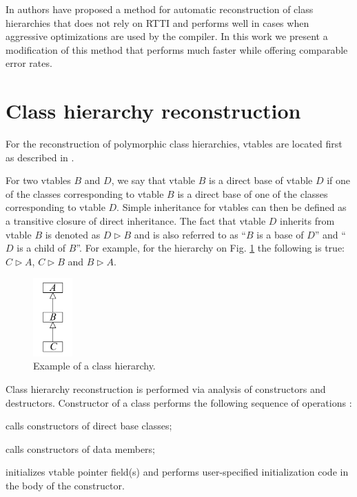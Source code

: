 \documentclass[times, 10pt,twocolumn]{article}
\renewcommand{\~}{{\raise.35ex\hbox{$\scriptstyle\sim$}}}
\newcounter{xcounter}
\renewenvironment{enumerate}{
    \begin{list}{\arabic{xcounter})}{\usecounter{xcounter} \itemsep=-\parsep}
}{
	\end{list}
}
\begin{document}
In \cite{fokin10} authors have proposed a
method for automatic reconstruction of class hierarchies
that does not rely on RTTI and performs well in cases
when aggressive optimizations are used by the compiler.
In this work we present a modification of this method
that performs much faster while offering comparable
error rates.




\quad
\section{Class hierarchy reconstruction}\label{sectionClasses}
For the reconstruction of polymorphic class hierarchies, vtables
are located first as described in \cite{fokin10}.

For two vtables $B$ and $D$, we say that vtable $B$ is a direct base of vtable $D$ if
one of the classes corresponding to vtable $B$ is a direct base of one of
the classes corresponding to vtable $D$.
Simple inheritance for vtables can then be defined as a transitive
closure of direct inheritance. The fact that vtable $D$ inherits
from vtable $B$ is denoted as $D \rhd B$ and is also referred to as
``$B$ is a base of $D$'' and ``$D$ is a child of $B$''. For example, for the
hierarchy on Fig. \ref{fig:abc} the following is true: 
$C \rhd A$, $C \rhd B$ and $B \rhd A$.

\begin{figure}[tb!]
\centering
  \includegraphics[height=3.0cm]{images/abc}
\caption{Example of a class hierarchy.}
\label{fig:abc}
\end{figure}

Class hierarchy reconstruction is performed via analysis of constructors
and destructors. Constructor of a class performs the following sequence
of operations \cite{cpp03, gray94}:
\begin{enumerate}
\item calls constructors of direct base classes;
\item calls constructors of data members;
\item initializes vtable pointer field(s) and
      performs user-specified initialization code in the body
      of the constructor.
\end{enumerate}
\end{document}
